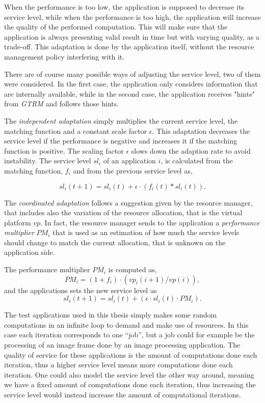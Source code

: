 \documentclass[nobiblatex]{LTHthesis}
\begin{document}
When the performance is too low, the application is supposed to decrease its
service level, while when the performance is too high, the application will
increase the quality of the performed computation. This will make sure that
the application is always presenting valid result in time but with varying
quality, as a trade-off. This adaptation is done by the application itself,
without the resource management policy interfering with it.

There are of course many possible ways of adjusting the service level, two of them were considered.
In the first case, the application only considers information that are
internally available, while in the second case, the application receives
"hints" from \emph{GTRM} and follows those hints.

The \emph{independent adaptation} simply multiplies the current service level,
the matching function and a constant scale factor $\epsilon$. This adaptation
decreases the service level if the performance is negative and increases it 
if the matching function is positive. The scaling factor $\epsilon$ slows 
down the adaption rate to avoid instability. The service level $sl_i$ of an application $i$, is calculated from the matching function, $f_i$ and from the previous service level as,

\begin{equation}
sl_i(t+1)= sl_i(t) + \epsilon \cdot (f_i(t)*sl_i(t)).
\label{eq:simple_sl_rec}
\end{equation}

The \emph{coordinated adaptation} follows a suggestion given by the resource
manager, that includes also the variation of the resource allocation, that is the virtual platform $vp$. In fact,
the resource manager sends to the application a \emph{performance multiplier}
$PM_i$ that is used as an estimation of how much the service levels should
change to match the current allocation, that is unknown on the application
side.

The performance multiplier $PM_i$ is computed as,
\begin{equation}
PM_i = (1+f_i) \cdot (vp_i(i+1)/vp(i)),
\end{equation}
and the applications sets the new service level as
\begin{equation}
sl_i(t+1) = sl_i(t) + (\epsilon \cdot sl_i(t) \cdot PM_i).
\end{equation}

The test applications used in this thesis simply makes some random
computations in an infinite loop to demand and make use of resources. In this
case each iteration corresponds to one ``job'', but a job could for example
be the processing of an image frame done by an image processing application.
The quality of service for these applications is the amount of computations
done each iteration, thus a higher service level means more computations done 
each iteration. One could also model the service level the other way around,
meaning we have a fixed amount of computations done each iteration, thus
increasing the service level would instead increase the amount of
computational iterations.
\end{document}
